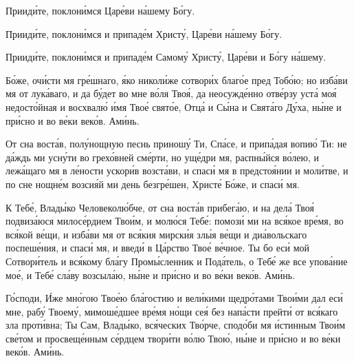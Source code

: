 \begin{mymulticols}
Приид\'{и}те, поклон\'{и}мся Цар\'{е}ви н\'{а}шему Б\'{о}гу. 

Приид\'{и}те, поклон\'{и}мся и припад\'{е}м Христ\'{у}, Цар\'{е}ви н\'{а}шему Б\'{о}гу. 

Приид\'{и}те, поклон\'{и}мся и припад\'{е}м Самом\'{у} Христ\'{у}, Цар\'{е}ви и Б\'{о}гу н\'{а}шему. 


\PsalmFifty


\SymbolOfFaith


Б\'{о}же, оч\'{и}сти мя гр\'{е}шнаго, \'{я}ко никол\'{и}же сотвор\'{и}х благ\'{о}е пред Тоб\'{о}ю; но изб\'{а}ви мя от лук\'{а}ваго, и да б\'{у}дет во мне в\'{о}ля Тво\'{я}, да неосужд\'{е}нно отв\'{е}рзу уст\'{а} мо\'{я} недост\'{о}йная и восхвал\'{ю} \'{и}мя Тво\'{е} свят\'{о}е, Отц\'{а} и С\'{ы}на и Свят\'{а}го Д\'{у}ха, н\'{ы}не и пр\'{и}сно и во в\'{е}ки век\'{о}в. Ам\'{и}нь.


От сна вост\'{а}в, пол\'{у}нощную песнь принош\'{у} Ти, Сп\'{а}се, и прип\'{а}дая вопи\'{ю} Ти: не д\'{а}ждь ми усн\'{у}ти во грех\'{о}вней см\'{е}рти, но ущ\'{е}дри мя, распн\'{ы}йся в\'{о}лею, и леж\'{а}щаго мя в л\'{е}ности ускор\'{и}в возст\'{а}ви, и спас\'{и} мя в предсто\'{я}нии и мол\'{и}тве, и по сне нощн\'{е}м возси\'{я}й ми день безгр\'{е}шен, Христ\'{е} Б\'{о}же, и спас\'{и} мя.


К Теб\'{е}, Влад\'{ы}ко Человекол\'{ю}бче, от сна вост\'{а}в прибег\'{а}ю, и на дел\'{а} Тво\'{я} подвиз\'{а}юся милос\'{е}рдием Тво\'{и}м, и мол\'{ю}ся Теб\'{е}: помоз\'{и} ми на вс\'{я}кое вр\'{е}мя, во вс\'{я}кой в\'{е}щи, и изб\'{а}ви мя от вс\'{я}кия мирск\'{и}я зл\'{ы}я в\'{е}щи и ди\'{а}вольскаго поспеш\'{е}ния, и спас\'{и} мя, и введ\'{и} в Ц\'{а}рство Тво\'{е} в\'{е}чное. Ты бо ес\'{и} мой Сотвор\'{и}тель и вс\'{я}кому бл\'{а}гу Пром\'{ы}сленник и Под\'{а}тель, о Теб\'{е} же все упов\'{а}ние мо\'{е}, и Теб\'{е} сл\'{а}ву возсыл\'{а}ю, н\'{ы}не и пр\'{и}сно и во в\'{е}ки век\'{о}в. Ам\'{и}нь.


Г\'{о}споди, \'{И}же мн\'{о}гою Тво\'{е}ю бл\'{а}гостию и вел\'{и}кими щедр\'{о}тами Тво\'{и}ми дал ес\'{и} мне, раб\'{у} Твоем\'{у}, мимош\'{е}дшее вр\'{е}мя н\'{о}щи се\'{я} без нап\'{а}сти прейт\'{и} от вс\'{я}каго зла прот\'{и}вна; Ты Сам, Влад\'{ы}ко, вс\'{я}ческих Тв\'{о}рче, спод\'{о}би мя \'{и}стинным Тво\'{и}м св\'{е}том и просвещ\'{е}нным с\'{е}рдцем твор\'{и}ти в\'{о}лю Тво\'{ю}, н\'{ы}не и пр\'{и}сно и во в\'{е}ки век\'{о}в. Ам\'{и}нь.


\end{mymulticols}
